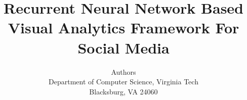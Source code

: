 \documentclass[letterpaper]{article}
\begin{document}
%
\title{Recurrent Neural Network Based Visual Analytics Framework For Social Media}
\author{Authors\\
Department of Computer Science, Virginia Tech\\
Blacksburg, VA 24060\\
}
\maketitle
\begin{abstract}
\begin{quote}



\end{quote}
\end{abstract}








\end{document}

